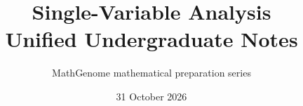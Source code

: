 \documentclass[11pt,oneside,a4paper]{book}
\begin{document}
\frontmatter
\title{Single-Variable Analysis\\Unified Undergraduate Notes}
\author{MathGenome mathematical preparation series}
\date{31 October 2026}
\hypersetup{pageanchor=false}
\maketitle
\clearpage
{}
\hypersetup{pageanchor=true}

\tableofcontents
\mainmatter




















\appendix


\end{document}
